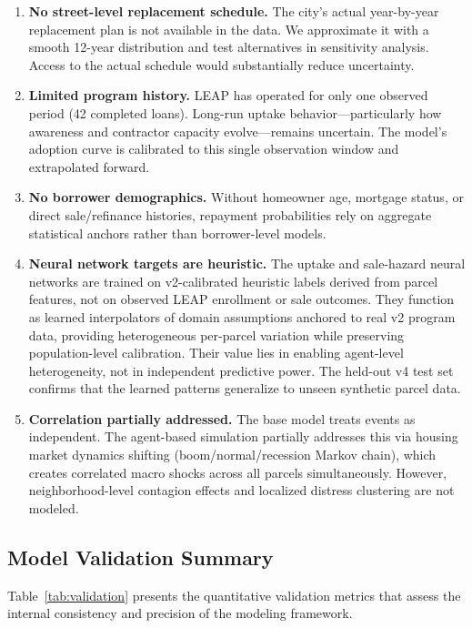 \documentclass[11pt, letterpaper]{article}
\begin{document}
\begin{enumerate}[nosep]
  \item \textbf{No street-level replacement schedule.} The city's actual year-by-year replacement plan is not available in the data. We approximate it with a smooth 12-year distribution and test alternatives in sensitivity analysis. Access to the actual schedule would substantially reduce uncertainty.
  \item \textbf{Limited program history.} LEAP has operated for only one observed period (42 completed loans). Long-run uptake behavior---particularly how awareness and contractor capacity evolve---remains uncertain. The model's adoption curve is calibrated to this single observation window and extrapolated forward.
  \item \textbf{No borrower demographics.} Without homeowner age, mortgage status, or direct sale/refinance histories, repayment probabilities rely on aggregate statistical anchors rather than borrower-level models.
  \item \textbf{Neural network targets are heuristic.} The uptake and sale-hazard neural networks are trained on v2-calibrated heuristic labels derived from parcel features, not on observed LEAP enrollment or sale outcomes. They function as learned interpolators of domain assumptions anchored to real v2 program data, providing heterogeneous per-parcel variation while preserving population-level calibration. Their value lies in enabling agent-level heterogeneity, not in independent predictive power. The held-out v4 test set confirms that the learned patterns generalize to unseen synthetic parcel data.
  \item \textbf{Correlation partially addressed.} The base model treats events as independent. The agent-based simulation partially addresses this via housing market dynamics shifting (boom/normal/recession Markov chain), which creates correlated macro shocks across all parcels simultaneously. However, neighborhood-level contagion effects and localized distress clustering are not modeled.
\end{enumerate}

\subsection{Model Validation Summary}

Table~\ref{tab:validation} presents the quantitative validation metrics that assess the internal consistency and precision of the modeling framework.
\end{document}
